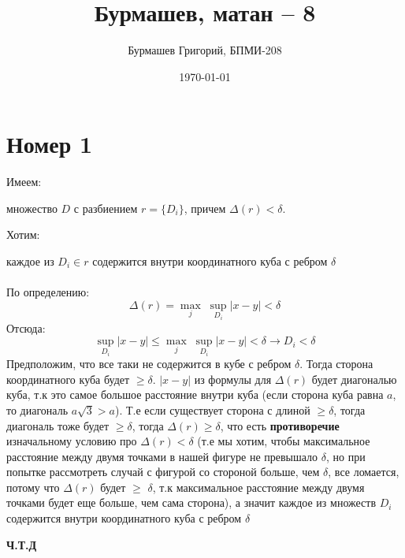 \documentclass[a4paper,12pt]{article}
\author{Бурмашев Григорий, БПМИ-208}
\title{Бурмашев, матан -- 8}
\date{\today}
\begin{document}
\maketitle
\section*{Номер 1}
\begin{center}
Имеем:
\end{center}
множество $D$ с разбиением $r = \{D_i\}$, причем $\Delta(r) < \delta$.
\begin{center}
Хотим:
\end{center}
каждое из $D_i \in r$ содержится внутри координатного куба с ребром $\delta$
\\\\
По определению:
\[
\Delta(r) = \underset{j}{\max} \; \underset{D_i}{\sup} |x - y| < \delta
\]
Отсюда:
\[
\underset{D_i}{\sup} |x - y| \leq \underset{j}{\max} \; \underset{D_i}{\sup} |x - y| < \delta \rightarrow D_i < \delta
\]
Предположим, что все таки не содержится в кубе с ребром $\delta$. Тогда сторона координатного куба будет $\geq \delta$. $|x - y|$ из формулы для $\Delta(r)$ будет диагональю куба, т.к это самое большое расстояние внутри куба (если сторона куба равна $a$, то диагональ $a \sqrt{3} > a$). Т.е если существует сторона с длиной $\geq \delta$, тогда диагональ тоже будет $\geq \delta$, тогда $\Delta(r) \geq \delta$, что есть \textbf{противоречие} изначальному условию про $\Delta(r) < \delta$ (т.е мы хотим, чтобы максимальное расстояние между двумя точками в нашей фигуре не превышало $\delta$, но при попытке рассмотреть случай с фигурой со стороной больше, чем $\delta$, все ломается, потому что $\Delta(r)$ будет $\geq$ $\delta$, т.к максимальное расстояние между двумя точками будет еще больше, чем сама сторона), а значит каждое из множеств $D_i$ содержится внутри координатного куба с ребром $\delta$
\begin{center}
\textbf{Ч.Т.Д} 
\end{center}
\clearpage
\end{document}
